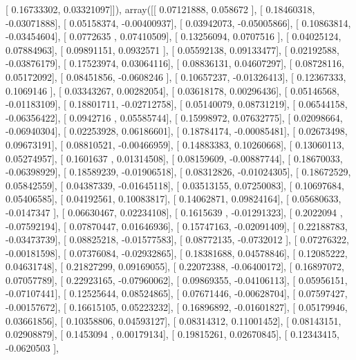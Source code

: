 \documentclass{article}
\begin{document}
       [ 0.16733302,  0.03321097]]), array([[ 0.07121888,  0.058672  ],
       [ 0.18460318, -0.03071888],
       [ 0.05158374, -0.00400937],
       [ 0.03942073, -0.05005866],
       [ 0.10863814, -0.03454604],
       [ 0.0772635 ,  0.07410509],
       [ 0.13256094,  0.0707516 ],
       [ 0.04025124,  0.07884963],
       [ 0.09891151,  0.0932571 ],
       [ 0.05592138,  0.09133477],
       [ 0.02192588, -0.03876179],
       [ 0.17523974,  0.03064116],
       [ 0.08836131,  0.04607297],
       [ 0.08728116,  0.05172092],
       [ 0.08451856, -0.0608246 ],
       [ 0.10657237, -0.01326413],
       [ 0.12367333,  0.1069146 ],
       [ 0.03343267,  0.00282054],
       [ 0.03618178,  0.00296436],
       [ 0.05146568, -0.01183109],
       [ 0.18801711, -0.02712758],
       [ 0.05140079,  0.08731219],
       [ 0.06544158, -0.06356422],
       [ 0.0942716 ,  0.05585744],
       [ 0.15998972,  0.07632775],
       [ 0.02098664, -0.06940304],
       [ 0.02253928,  0.06186601],
       [ 0.18784174, -0.00085481],
       [ 0.02673498,  0.09673191],
       [ 0.08810521, -0.00466959],
       [ 0.14883383,  0.10260668],
       [ 0.13060113,  0.05274957],
       [ 0.1601637 ,  0.01314508],
       [ 0.08159609, -0.00887744],
       [ 0.18670033, -0.06398929],
       [ 0.18589239, -0.01906518],
       [ 0.08312826, -0.01024305],
       [ 0.18672529,  0.05842559],
       [ 0.04387339, -0.01645118],
       [ 0.03513155,  0.07250083],
       [ 0.10697684,  0.05406585],
       [ 0.04192561,  0.10083817],
       [ 0.14062871,  0.09824164],
       [ 0.05680633, -0.0147347 ],
       [ 0.06630467,  0.02234108],
       [ 0.1615639 , -0.01291323],
       [ 0.2022094 , -0.07592194],
       [ 0.07870447,  0.01646936],
       [ 0.15747163, -0.02091409],
       [ 0.22188783, -0.03473739],
       [ 0.08825218, -0.01577583],
       [ 0.08772135, -0.0732012 ],
       [ 0.07276322, -0.00181598],
       [ 0.07376084, -0.02932865],
       [ 0.18381688,  0.04578846],
       [ 0.12085222,  0.04631748],
       [ 0.21827299,  0.09169055],
       [ 0.22072388, -0.06400172],
       [ 0.16897072,  0.07057789],
       [ 0.22923165, -0.07960062],
       [ 0.09869355, -0.04106113],
       [ 0.05956151, -0.07107441],
       [ 0.12525644,  0.08524865],
       [ 0.07671446, -0.00628704],
       [ 0.07597427, -0.00157672],
       [ 0.16615105,  0.05223232],
       [ 0.16896892, -0.01601827],
       [ 0.05179946,  0.03661856],
       [ 0.10358806,  0.04593127],
       [ 0.08314312,  0.11001452],
       [ 0.08143151,  0.02908879],
       [ 0.1453094 ,  0.00179134],
       [ 0.19815261,  0.02670845],
       [ 0.12343415, -0.0620503 ],
\end{document}
